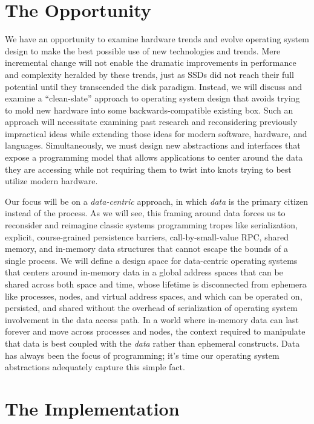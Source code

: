 \section*{The Opportunity}
We have an opportunity to examine hardware trends and evolve operating system design to make the best possible use of
new technologies and trends. Mere incremental change will not enable the dramatic improvements in performance and
complexity heralded by these trends, just as SSDs did not reach their full potential until they transcended the disk paradigm. Instead, we will discuss and examine a ``clean-slate'' approach to
operating system design that avoids trying to mold new hardware into some backwards-compatible existing box. Such an
approach will necessitate examining past research and reconsidering previously impractical ideas while extending those
ideas for modern software, hardware, and languages. Simultaneously, we must design new abstractions and interfaces that
expose a programming model that allows applications to center around the data they are accessing while not requiring
them to twist into knots trying to best utilize modern hardware.

Our focus will be on a \emph{data-centric} approach, in which \emph{data} is the primary citizen instead of the process.
As we will see, this framing around data forces us to reconsider and reimagine classic systems programming tropes like serialization,
explicit, course-grained persistence barriers, call-by-small-value RPC, shared memory, and in-memory data structures
that cannot escape the bounds of a single process. We will define a design space for data-centric operating systems that
centers around in-memory data in a global address spaces that can be shared across both space and time, whose lifetime
is disconnected from ephemera like processes, nodes, and virtual address spaces, and which can be operated on,
persisted, and shared without the overhead of serialization of operating system involvement in the data access path.
In a world where in-memory data can last forever and move across processes and nodes, the context required to manipulate
that data is best coupled with the \emph{data} rather than ephemeral constructs.
Data has always been the focus of programming; it's time our operating system abstractions adequately capture this
simple fact.


\section*{The Implementation}

